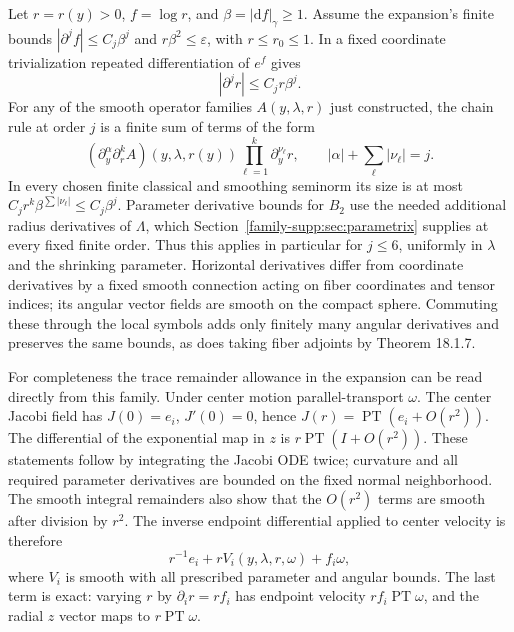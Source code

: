 \documentclass[11pt]{article}
\theoremstyle{definition}
\theoremstyle{remark}
\newcommand{\dd}{\mathrm d}
\numberwithin{equation}{section}
\providecommand{\la}{\lambda}
\begin{document}
Let $r=r(y)>0$, $f=\log r$, and $\beta=|\dd f|_\gamma\geq1$. Assume the
expansion's finite bounds $|\partial^j f|\leq C_j\beta^j$ and
$r\beta^2\leq\varepsilon$, with $r\leq r_0\leq1$. In a fixed coordinate
trivialization repeated differentiation of $e^f$ gives
\begin{equation}\label{family-supp:eq:rj}
 |\partial^j r|\leq C_jr\beta^j.
\end{equation}
For any of the smooth operator families $A(y,\la,r)$ just constructed,
the chain rule at order $j$ is a finite sum of terms of the form
\[
 (\partial_y^{\alpha}\partial_r^k A)(y,\la,r(y))
                      \prod_{\ell=1}^k\partial_y^{\nu_\ell}r,
 \qquad |\alpha|+\sum_\ell|\nu_\ell|=j.
\]
In every chosen finite classical and smoothing seminorm its size is at
most $C_jr^k\beta^{\sum|\nu_\ell|}\leq C_j\beta^j$. Parameter derivative
bounds for $B_2$ use the needed additional radius derivatives of $\Lambda$,
which Section~\ref{family-supp:sec:parametrix} supplies at every fixed finite order.
Thus this applies in particular for $j\leq6$, uniformly in $\la$ and the
shrinking parameter. Horizontal derivatives differ from coordinate
derivatives by a fixed smooth connection acting on fiber coordinates and
tensor indices; its angular vector fields are smooth on the compact
sphere. Commuting these through the local symbols adds only finitely many
angular derivatives and preserves the same bounds, as does taking fiber
adjoints by Theorem 18.1.7.

For completeness the trace remainder allowance in the expansion can be
read directly from this family. Under center motion parallel-transport
$\omega$. The center Jacobi field has $J(0)=e_i$, $J'(0)=0$, hence
$J(r)=\operatorname{PT}(e_i+O(r^2))$. The differential of the exponential
map in $z$ is $r\operatorname{PT}(I+O(r^2))$. These statements follow by
integrating the Jacobi ODE twice; curvature and all required parameter
derivatives are bounded on the fixed normal neighborhood. The smooth
integral remainders also show that the $O(r^2)$ terms are smooth after
division by $r^2$. The inverse endpoint differential applied to center
velocity is therefore
\begin{equation}\label{family-supp:eq:velocity}
 r^{-1}e_i+rV_i(y,\la,r,\omega)+f_i\omega,
\end{equation}
where $V_i$ is smooth with all prescribed parameter and angular bounds.
The last term is exact: varying $r$ by $\partial_i r=r f_i$ has endpoint
velocity $r f_i\operatorname{PT}\omega$, and the radial $z$ vector maps
to $r\operatorname{PT}\omega$.
\end{document}
